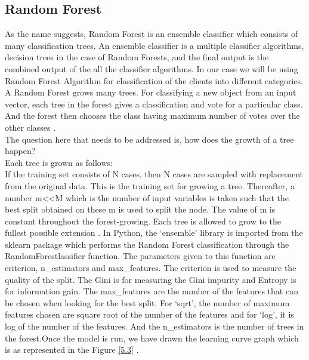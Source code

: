 \subsection{Random Forest} 
As the name suggests, Random Forest is an ensemble classifier which consists of many classification trees. An ensemble classifier is a multiple classifier algorithms, decision trees in the case of Random Forests, and the final output is the combined output of the all the classifier algorithms. In our case we will be using Random Forest Algorithm for classification of the clients into different categories. A Random Forest grows many trees. For classifying a new object from an input vector, each tree in the forest gives a classification and vote for a particular class. And the forest then chooses the class having maximum number of votes over the other classes \cite{link13}.\\
The question here that needs to be addressed is, how does the growth of a tree happen?\\
Each tree is grown as follows:\\
If the training set consists of N cases, then N cases are sampled with replacement from the original data. This is the training set for growing a tree. Thereafter, a number m<<M which is the number of input variables is taken such that the best split obtained on these m is used to split the node. The value of m is constant throughout the forest-growing. Each tree is allowed to grow to the fullest possible extension \cite{link13}.
In Python, the `ensemble' library is imported from the sklearn package which performs the Random Forest classification through the RandomForestlassifier function. The parameters given to this function are criterion, n\_estimators and max\_features. The criterion is used to measure the quality of the split. The Gini is for measuring the Gini impurity and Entropy is for information gain. The max\_features are the number of the features that can be chosen when looking for the best split. For `sqrt', the number of maximum features chosen are square root of the number of the features and for `log', it is log of the number of the features. And the n\_estimators is the number of trees in the forest.Once the model is run, we have drawn the learning curve graph which is as represented in the Figure \ref{5.3} .

